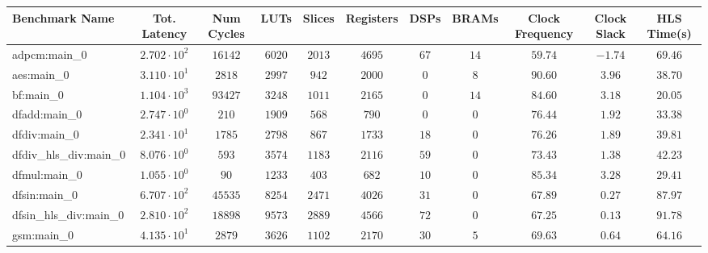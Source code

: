 \begin{tabular}{|l|c|c|c|c|c|c|c|c|c|c|}
\hline
Benchmark Name          & Tot. Latency           & Num Cycles & LUTs      & Slices    & Registers & DSPs    & BRAMs   & Clock Frequency & Clock Slack & HLS Time(s) \\
\hline
adpcm:main\_0           & $ 2.702 \cdot 10^{2} $ & $ 16142  $ & $ 6020  $ & $ 2013  $ & $ 4695  $ & $ 67  $ & $ 14  $ & $ 59.74       $ & $ -1.74   $ & $ 69.46   $ \\
aes:main\_0             & $ 3.110 \cdot 10^{1} $ & $ 2818   $ & $ 2997  $ & $ 942   $ & $ 2000  $ & $ 0   $ & $ 8   $ & $ 90.60       $ & $ 3.96    $ & $ 38.70   $ \\
bf:main\_0              & $ 1.104 \cdot 10^{3} $ & $ 93427  $ & $ 3248  $ & $ 1011  $ & $ 2165  $ & $ 0   $ & $ 14  $ & $ 84.60       $ & $ 3.18    $ & $ 20.05   $ \\
dfadd:main\_0           & $ 2.747 \cdot 10^{0} $ & $ 210    $ & $ 1909  $ & $ 568   $ & $ 790   $ & $ 0   $ & $ 0   $ & $ 76.44       $ & $ 1.92    $ & $ 33.38   $ \\
dfdiv:main\_0           & $ 2.341 \cdot 10^{1} $ & $ 1785   $ & $ 2798  $ & $ 867   $ & $ 1733  $ & $ 18  $ & $ 0   $ & $ 76.26       $ & $ 1.89    $ & $ 39.81   $ \\
dfdiv\_hls\_div:main\_0 & $ 8.076 \cdot 10^{0} $ & $ 593    $ & $ 3574  $ & $ 1183  $ & $ 2116  $ & $ 59  $ & $ 0   $ & $ 73.43       $ & $ 1.38    $ & $ 42.23   $ \\
dfmul:main\_0           & $ 1.055 \cdot 10^{0} $ & $ 90     $ & $ 1233  $ & $ 403   $ & $ 682   $ & $ 10  $ & $ 0   $ & $ 85.34       $ & $ 3.28    $ & $ 29.41   $ \\
dfsin:main\_0           & $ 6.707 \cdot 10^{2} $ & $ 45535  $ & $ 8254  $ & $ 2471  $ & $ 4026  $ & $ 31  $ & $ 0   $ & $ 67.89       $ & $ 0.27    $ & $ 87.97   $ \\
dfsin\_hls\_div:main\_0 & $ 2.810 \cdot 10^{2} $ & $ 18898  $ & $ 9573  $ & $ 2889  $ & $ 4566  $ & $ 72  $ & $ 0   $ & $ 67.25       $ & $ 0.13    $ & $ 91.78   $ \\
gsm:main\_0             & $ 4.135 \cdot 10^{1} $ & $ 2879   $ & $ 3626  $ & $ 1102  $ & $ 2170  $ & $ 30  $ & $ 5   $ & $ 69.63       $ & $ 0.64    $ & $ 64.16   $ \\

\end{tabular}
